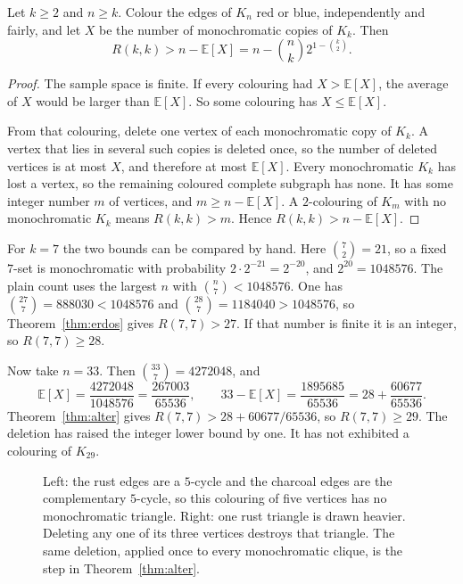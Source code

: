 \begin{theorem}[alteration]\label{thm:alter}
Let $k\ge2$ and $n\ge k$. Colour the edges of $K_n$ red or blue, independently and fairly, and let $X$ be the number of monochromatic copies of $K_k$. Then
\[
 R(k,k)>n-\mathbb E[X]=n-\binom{n}{k}2^{1-\binom{k}{2}}.
\]
\end{theorem}
\begin{proof}
The sample space is finite. If every colouring had $X>\mathbb E[X]$, the average of $X$ would be larger than $\mathbb E[X]$. So some colouring has $X\le\mathbb E[X]$.

From that colouring, delete one vertex of each monochromatic copy of $K_k$. A vertex that lies in several such copies is deleted once, so the number of deleted vertices is at most $X$, and therefore at most $\mathbb E[X]$. Every monochromatic $K_k$ has lost a vertex, so the remaining coloured complete subgraph has none. It has some integer number $m$ of vertices, and $m\ge n-\mathbb E[X]$. A $2$-colouring of $K_m$ with no monochromatic $K_k$ means $R(k,k)>m$. Hence $R(k,k)>n-\mathbb E[X]$.
\end{proof}

For $k=7$ the two bounds can be compared by hand. Here $\binom{7}{2}=21$, so a fixed $7$-set is monochromatic with probability $2\cdot2^{-21}=2^{-20}$, and $2^{20}=1048576$. The plain count uses the largest $n$ with $\binom{n}{7}<1048576$. One has $\binom{27}{7}=888030<1048576$ and $\binom{28}{7}=1184040>1048576$, so Theorem~\ref{thm:erdos} gives $R(7,7)>27$. If that number is finite it is an integer, so $R(7,7)\ge28$.

Now take $n=33$. Then $\binom{33}{7}=4272048$, and
\[
 \mathbb E[X]=\frac{4272048}{1048576}=\frac{267003}{65536},\qquad
 33-\mathbb E[X]=\frac{1895685}{65536}=28+\frac{60677}{65536}.
\]
Theorem~\ref{thm:alter} gives $R(7,7)>28+60677/65536$, so $R(7,7)\ge29$. The deletion has raised the integer lower bound by one. It has not exhibited a colouring of $K_{29}$.

\begin{figure}[ht]
\centering
{}
\caption{Left: the rust edges are a $5$-cycle and the charcoal edges are the complementary $5$-cycle, so this colouring of five vertices has no monochromatic triangle. Right: one rust triangle is drawn heavier. Deleting any one of its three vertices destroys that triangle. The same deletion, applied once to every monochromatic clique, is the step in Theorem~\ref{thm:alter}.}
\label{fig:ramseyalter}
\end{figure}

